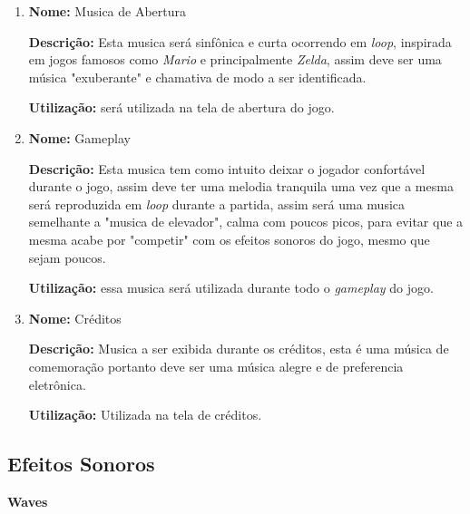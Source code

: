 \documentclass[11pt]{article} %
\begin{document}
\begin{enumerate}
\item 
\textbf{Nome:} Musica de Abertura

\textbf{Descrição:} Esta musica será sinfônica e curta ocorrendo em \textit{loop}, inspirada em jogos famosos como \textit{Mario} e principalmente \textit{Zelda}, assim deve ser uma música "exuberante" e chamativa de modo a ser identificada.

\textbf{Utilização:} será utilizada na tela de abertura do jogo.

\item
\textbf{Nome:} Gameplay

\textbf{Descrição:} Esta musica tem como intuito deixar o jogador confortável durante o jogo, assim deve ter uma melodia tranquila uma vez que a mesma será reproduzida em \textit{loop} durante a partida, assim será uma musica semelhante a "musica de elevador", calma com poucos picos, para evitar que a mesma acabe por "competir" com os efeitos sonoros do jogo, mesmo que sejam poucos.  

\textbf{Utilização:} essa musica será utilizada durante todo o \textit{gameplay} do jogo.

\item
\textbf{Nome:} Créditos

\textbf{Descrição:} Musica a ser exibida durante os créditos, esta é uma música de comemoração portanto deve ser uma música alegre e de preferencia eletrônica. 

\textbf{Utilização:} Utilizada na tela de créditos.
\end{enumerate}

\subsection{Efeitos Sonoros}

\begin{LARGE}
\textbf{Waves}
\end{LARGE}
\end{document}

